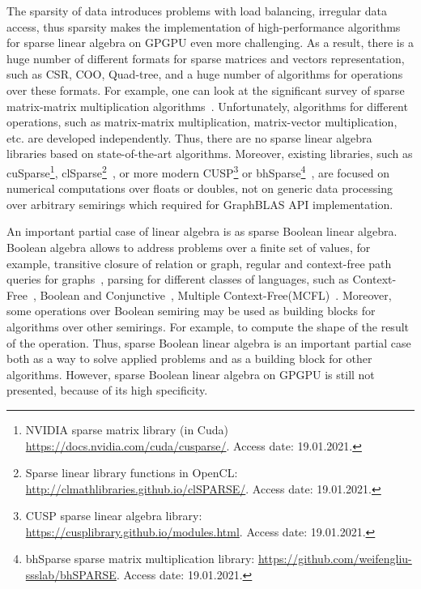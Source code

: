 The sparsity of data introduces problems with load balancing, irregular data access, thus sparsity makes the implementation of high-performance algorithms for sparse linear algebra on GPGPU even more challenging.
As a result, there is a huge number of different formats for sparse matrices and vectors representation, such as CSR, COO, Quad-tree, and a huge number of algorithms for operations over these formats. 
For example, one can look at the significant survey of sparse matrix-matrix multiplication algorithms~\cite{Gao2020ASS}. 
Unfortunately, algorithms for different operations, such as matrix-matrix multiplication, matrix-vector multiplication, etc. are developed independently. 
Thus, there are no sparse linear algebra libraries based on state-of-the-art algorithms.
Moreover, existing libraries, such as cuSparse\footnote{NVIDIA sparse matrix library (in Cuda) \url{https://docs.nvidia.com/cuda/cusparse/}. Access date: 19.01.2021.}, clSparse\footnote{Sparse linear library functions in OpenCL: \url{http://clmathlibraries.github.io/clSPARSE/}. Access date: 19.01.2021.}~\cite{10.1145/2909437.2909442}, or more modern CUSP\footnote{CUSP sparse linear algebra library: \url{https://cusplibrary.github.io/modules.html}. Access date: 19.01.2021.} or bhSparse\footnote{bhSparse sparse matrix multiplication library: \url{https://github.com/weifengliu-ssslab/bhSPARSE}. Access date: 19.01.2021.}~\cite{10.1016/j.jpdc.2015.06.010}, are focused on numerical computations over floats or doubles, not on generic data processing over arbitrary semirings which required for GraphBLAS API implementation.

An important partial case of linear algebra is as sparse Boolean linear algebra.
Boolean algebra allows to address problems over a finite set of values, for example, transitive closure of relation or graph, regular and context-free path queries for graphs~\cite{10.1145/3210259.3210264}, parsing for different classes of languages, such as Context-Free~\cite{10.1016/S0022-0000(75)80046-8}, Boolean and Conjunctive~\cite{OKHOTIN2014101}, Multiple Context-Free(MCFL)~\cite{10.5555/972525.972527}.
Moreover, some operations over Boolean semiring may be used as building blocks for algorithms over other semirings. 
For example, to compute the shape of the result of the operation.
Thus, sparse Boolean linear algebra is an important partial case both as a way to solve applied problems and as a building block for other algorithms.
However, sparse Boolean linear algebra on GPGPU is still not presented, because of its high specificity.

